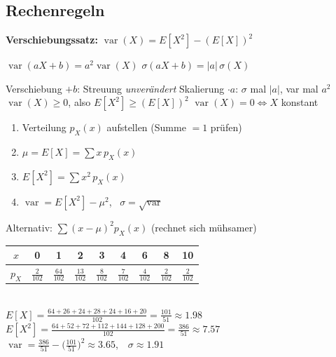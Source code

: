 \subsection{Rechenregeln}
\begin{formel}
\textbf{Verschiebungssatz:}\quad
$\operatorname{var}(X)=E[X^2]-(E[X])^2$
\end{formel}
\begin{formel}
$\operatorname{var}(aX+b)=a^2\operatorname{var}(X)$\qquad
$\sigma(aX+b)=|a|\,\sigma(X)$
\end{formel}
\begin{itemize}
\pfeil Verschiebung $+b$: Streuung \emph{unverändert}
\pfeil Skalierung $\cdot a$: $\sigma$ mal $|a|$, var mal $a^2$
\pfeil $\operatorname{var}(X)\ge0$, also $E[X^2]\ge(E[X])^2$
\pfeil $\operatorname{var}(X)=0\Leftrightarrow X$ konstant
\end{itemize}


\begin{merke}
\begin{enumerate}[label=\arabic*.,leftmargin=*]
\item Verteilung $p_X(x)$ aufstellen (Summe $=1$ prüfen)
\item $\mu=E[X]=\sum x\,p_X(x)$
\item $E[X^2]=\sum x^2\,p_X(x)$
\item $\operatorname{var}=E[X^2]-\mu^2$, \ $\sigma=\sqrt{\operatorname{var}}$
\end{enumerate}
\begin{itemize}
\pfeil Alternativ: $\sum (x-\mu)^2p_X(x)$ (rechnet sich mühsamer)
\end{itemize}
\end{merke}

\begin{bsp}
\begin{tabular}{@{}c|cccccccc@{}}
$x$&0&1&2&3&4&6&8&10\\\midrule
$p_X$&$\frac{2}{102}$&$\frac{64}{102}$&$\frac{13}{102}$&$\frac{8}{102}$&$\frac{7}{102}$&$\frac{4}{102}$&$\frac{2}{102}$&$\frac{2}{102}$
\end{tabular}\\[2pt]
$E[X]=\frac{64+26+24+28+24+16+20}{102}=\frac{101}{51}\approx1.98$\\
$E[X^2]=\frac{64+52+72+112+144+128+200}{102}=\frac{386}{51}\approx7.57$\\
$\operatorname{var}=\frac{386}{51}-\big(\frac{101}{51}\big)^2\approx3.65$,\ \ $\sigma\approx1.91$
\end{bsp}

